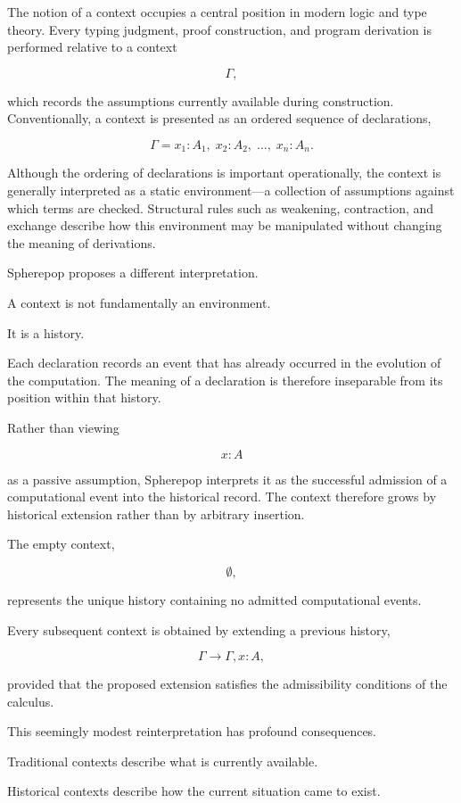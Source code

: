\documentclass[12pt,oneside]{article}
\theoremstyle{definition}
\theoremstyle{remark}
\begin{document}
The notion of a context occupies a central position in modern logic and type
theory. Every typing judgment, proof construction, and program derivation is
performed relative to a context

\[
\Gamma,
\]

which records the assumptions currently available during construction.
Conventionally, a context is presented as an ordered sequence of declarations,

\[
\Gamma
=
x_1:A_1,\;
x_2:A_2,\;
\ldots,\;
x_n:A_n.
\]

Although the ordering of declarations is important operationally, the context
is generally interpreted as a static environment—a collection of assumptions
against which terms are checked. Structural rules such as weakening,
contraction, and exchange describe how this environment may be manipulated
without changing the meaning of derivations.

Spherepop proposes a different interpretation.

A context is not fundamentally an environment.

It is a history.

Each declaration records an event that has already occurred in the evolution
of the computation. The meaning of a declaration is therefore inseparable from
its position within that history.

Rather than viewing

\[
x:A
\]

as a passive assumption, Spherepop interprets it as the successful admission
of a computational event into the historical record. The context therefore
grows by historical extension rather than by arbitrary insertion.

The empty context,

\[
\emptyset,
\]

represents the unique history containing no admitted computational events.

Every subsequent context is obtained by extending a previous history,

\[
\Gamma
\longrightarrow
\Gamma,x:A,
\]

provided that the proposed extension satisfies the admissibility conditions of
the calculus.

This seemingly modest reinterpretation has profound consequences.

Traditional contexts describe what is currently available.

Historical contexts describe how the current situation came to exist.
\end{document}
